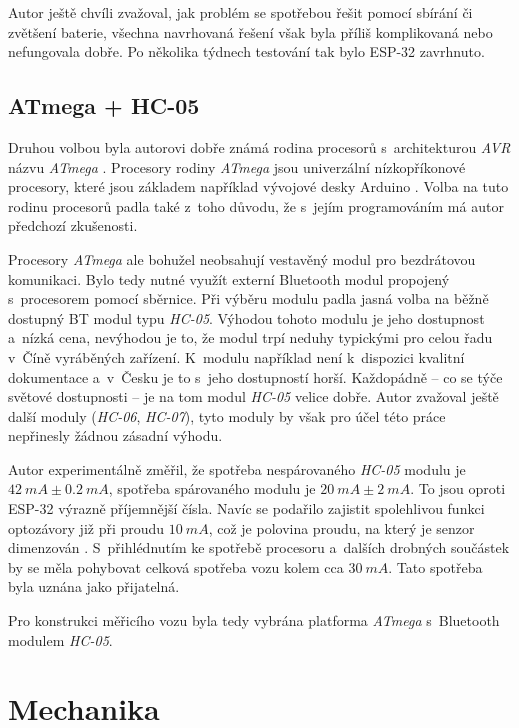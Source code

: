 Autor ještě chvíli zvažoval, jak problém se spotřebou řešit pomocí sbírání či
zvětšení baterie, všechna navrhovaná řešení však byla příliš komplikovaná nebo
nefungovala dobře. Po několika týdnech testování tak bylo ESP-32 zavrhnuto.

\subsection{ATmega + HC-05}
\label{subsec:wsm-atmega}

Druhou volbou byla autorovi dobře známá rodina procesorů s~architekturou
\textit{AVR} názvu \textit{ATmega} \cite{avr}. Procesory rodiny \textit{ATmega}
jsou univerzální nízkopříkonové procesory, které jsou základem například
vývojové desky Arduino \cite{arduino}. Volba na tuto rodinu procesorů padla
také z~toho důvodu, že s~jejím programováním má autor předchozí zkušenosti.

Procesory \textit{ATmega} ale bohužel neobsahují vestavěný modul pro
bezdrátovou komunikaci.  Bylo tedy nutné využít externí Bluetooth modul
propojený s~procesorem pomocí sběrnice. Při výběru modulu padla jasná volba na
běžně dostupný BT modul typu \textit{HC-05}. Výhodou tohoto modulu je jeho
dostupnost a~nízká cena, nevýhodou je to, že modul trpí neduhy typickými pro
celou řadu v~Číně vyráběných zařízení. K~modulu například není k~dispozici
kvalitní dokumentace a~v~Česku je to s~jeho dostupností horší. Každopádně
-- co se týče světové dostupnosti -- je na tom modul \textit{HC-05} velice
dobře. Autor zvažoval ještě další moduly (\textit{HC-06}, \textit{HC-07}), tyto
moduly by však pro účel této práce nepřinesly žádnou zásadní výhodu.

Autor experimentálně změřil, že spotřeba nespárovaného \textit{HC-05} modulu je
$42\ mA \pm 0.2\ mA$, spotřeba spárovaného modulu je $20\ mA \pm 2\ mA$. To
jsou oproti ESP-32 výrazně příjemnější čísla. Navíc se podařilo zajistit
spolehlivou funkci optozávory již při proudu $10\ mA$, což je polovina proudu,
na který je senzor dimenzován \cite{gp1s23:datasheet}. S~přihlédnutím ke
spotřebě procesoru a~dalších drobných součástek by se měla pohybovat celková
spotřeba vozu kolem cca $30\ mA$. Tato spotřeba byla uznána jako přijatelná.

Pro konstrukci měřicího vozu byla tedy vybrána platforma \textit{ATmega}
s~Bluetooth modulem \textit{HC-05}.

\section{Mechanika}
\label{sec:wsm-mech}

